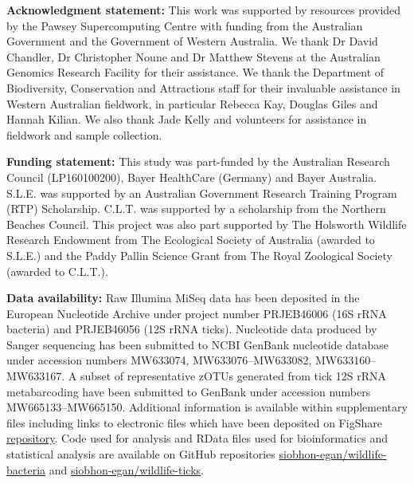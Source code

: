 \documentclass[a4paper, nobind]{templates/ociamthesis}
\begin{document}
\vspace{5mm}

\textbf{Acknowledgment statement:}
This work was supported by resources provided by the Pawsey Supercomputing Centre with funding from the Australian Government and the Government of Western Australia.
We thank Dr David Chandler, Dr Christopher Noune and Dr Matthew Stevens at the Australian Genomics Research Facility for their assistance.
We thank the Department of Biodiversity, Conservation and Attractions staff for their invaluable assistance in Western Australian fieldwork, in particular Rebecca Kay, Douglas Giles and Hannah Kilian.
We also thank Jade Kelly and volunteers for assistance in fieldwork and sample collection.

\vspace{5mm}

\textbf{Funding statement:}
This study was part-funded by the Australian Research Council (LP160100200), Bayer HealthCare (Germany) and Bayer Australia.
S.L.E. was supported by an Australian Government Research Training Program (RTP) Scholarship.
C.L.T. was supported by a scholarship from the Northern Beaches Council.
This project was also part supported by The Holsworth Wildlife Research Endowment from The Ecological Society of Australia (awarded to S.L.E.) and the Paddy Pallin Science Grant from The Royal Zoological Society (awarded to C.L.T.).

\vspace{5mm}

\textbf{Data availability:}
Raw Illumina MiSeq data has been deposited in the European Nucleotide Archive under project number PRJEB46006 (16S rRNA bacteria) and PRJEB46056 (12S rRNA ticks).
Nucleotide data produced by Sanger sequencing has been submitted to NCBI GenBank nucleotide database under accession numbers MW633074, MW633076--MW633082, MW633160--MW633167.
A subset of representative zOTUs generated from tick 12S rRNA metabarcoding have been submitted to GenBank under accession numbers MW665133--MW665150.
Additional information is available within supplementary files including links to electronic files which have been deposited on FigShare \href{https://doi.org/10.6084/m9.figshare.14363627.v1}{repository}.
Code used for analysis and RData files used for bioinformatics and statistical analysis are available on GitHub repositories \href{https://github.com/siobhon-egan/wildlife-bacteria}{siobhon-egan/wildlife-bacteria} and \href{https://github.com/siobhon-egan/wildlife-ticks}{siobhon-egan/wildlife-ticks}.
\end{document}
